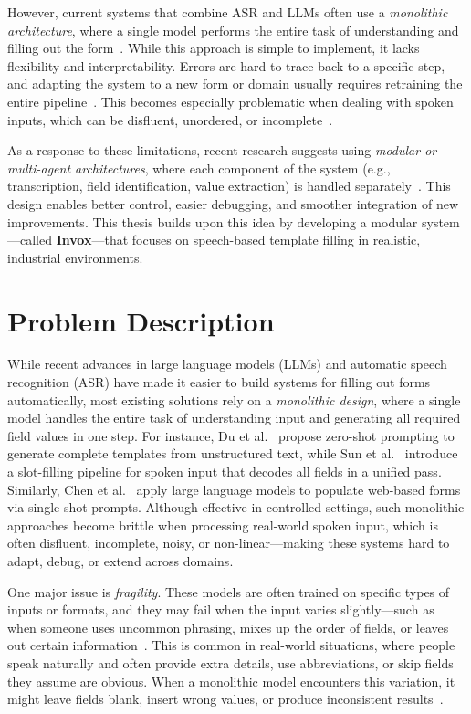 However, current systems that combine ASR and LLMs often use a \textit{monolithic architecture}, where a single model performs the entire task of understanding and filling out the form~\cite{sun2023slot, chen2024webform}. While this approach is simple to implement, it lacks flexibility and interpretability. Errors are hard to trace back to a specific step, and adapting the system to a new form or domain usually requires retraining the entire pipeline~\cite{liu2022conversational, schick2023toolformer}. This becomes especially problematic when dealing with spoken inputs, which can be disfluent, unordered, or incomplete~\cite{fathullah2023prompting}.

As a response to these limitations, recent research suggests using \textit{modular or multi-agent architectures}, where each component of the system (e.g., transcription, field identification, value extraction) is handled separately~\cite{mialon2023augmented, schick2023toolformer}. This design enables better control, easier debugging, and smoother integration of new improvements. This thesis builds upon this idea by developing a modular system—called \textbf{Invox}—that focuses on speech-based template filling in realistic, industrial environments.


\section{Problem Description}

While recent advances in large language models (LLMs) and automatic speech recognition (ASR) have made it easier to build systems for filling out forms automatically, most existing solutions rely on a \textit{monolithic design}, where a single model handles the entire task of understanding input and generating all required field values in one step. For instance, Du et al.~\cite{du2021template} propose zero-shot prompting to generate complete templates from unstructured text, while Sun et al.~\cite{sun2023slot} introduce a slot-filling pipeline for spoken input that decodes all fields in a unified pass. Similarly, Chen et al.~\cite{chen2024webform} apply large language models to populate web-based forms via single-shot prompts. Although effective in controlled settings, such monolithic approaches become brittle when processing real-world spoken input, which is often disfluent, incomplete, noisy, or non-linear—making these systems hard to adapt, debug, or extend across domains.


One major issue is \textit{fragility}. These models are often trained on specific types of inputs or formats, and they may fail when the input varies slightly—such as when someone uses uncommon phrasing, mixes up the order of fields, or leaves out certain information~\cite{fathullah2023prompting, liu2022conversational}. This is common in real-world situations, where people speak naturally and often provide extra details, use abbreviations, or skip fields they assume are obvious. When a monolithic model encounters this variation, it might leave fields blank, insert wrong values, or produce inconsistent results~\cite{wang2021spoken, sun2023slot}.

